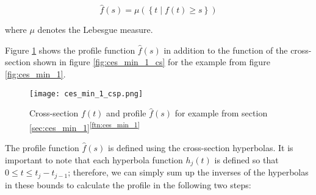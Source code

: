 $$\hat{f}(s) = \mu(\left\{ t \mid f(t) \geq s \right\})$$

where $\mu$ denotes the Lebesgue measure.\cite{rotelex}

Figure \ref{fig:ces_min_1_csp} shows the profile function $\hat{f}(s)$ in addition to the function of the cross-section shown in figure \ref{fig:ces_min_1_cs} for the example from figure \ref{fig:ces_min_1}.

 \begin{figure}[H]
    \centering
    
    \texttt{[image: ces\_min\_1\_csp.png]}
		
	\caption{Cross-section $f(t)$ and profile $\hat{f}(s)$ for example from section \ref{sec:ces_min_1}\textsuperscript{\ref{ftn:ces_min_1}}}
    \label{fig:ces_min_1_csp}
\end{figure}

The profile function $\hat{f}(s)$ is defined using the cross-section hyperbolas. It is important to note that each hyperbola function $h_j(t)$ is defined so that $0 \leq t \leq t_j - t_{j-1}$; therefore, we can simply sum up the inverses of the hyperbolas in these bounds to calculate the profile in the following two steps:

